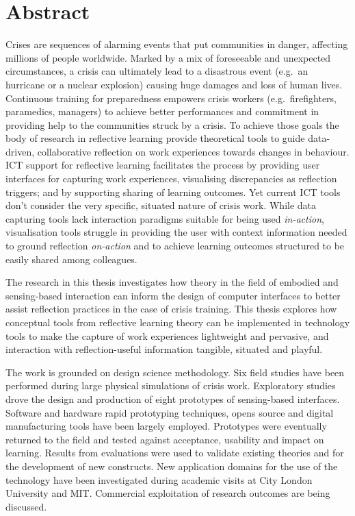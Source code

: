 \chapter*{Abstract}

Crises are sequences of alarming events that put communities in danger,
affecting millions of people worldwide. Marked by a mix of foreseeable
and unexpected circumstances, a crisis can ultimately lead to a
disastrous event (e.g.~an hurricane or a nuclear explosion) causing huge
damages and loss of human lives. Continuous training for preparedness
empowers crisis workers (e.g.~firefighters, paramedics, managers) to
achieve better performances and commitment in providing help to the
communities struck by a crisis. To achieve those goals the body of
research in reflective learning provide theoretical tools to guide
data-driven, collaborative reflection on work experiences towards
changes in behaviour. ICT support for reflective learning facilitates
the process by providing user interfaces for capturing work experiences,
visualising discrepancies as reflection triggers; and by supporting
sharing of learning outcomes. Yet current ICT tools don't consider the
very specific, situated nature of crisis work. While data capturing
tools lack interaction paradigms suitable for being used
\emph{in-action}, visualisation tools struggle in providing the user
with context information needed to ground reflection \emph{on-action}
and to achieve learning outcomes structured to be easily shared among
colleagues.

The research in this thesis investigates how theory in the field of
embodied and sensing-based interaction can inform the design of computer
interfaces to better assist reflection practices in the case of crisis
training. This thesis explores how conceptual tools from reflective
learning theory can be implemented in technology tools to make the
capture of work experiences lightweight and pervasive, and interaction
with reflection-useful information tangible, situated and playful.

The work is grounded on design science methodology. Six field studies
have been performed during large physical simulations of crisis work.
Exploratory studies drove the design and production of eight prototypes
of sensing-based interfaces. Software and hardware rapid prototyping
techniques, opens source and digital manufacturing tools have been
largely employed. Prototypes were eventually returned to the field and
tested against acceptance, usability and impact on learning. Results
from evaluations were used to validate existing theories and for the
development of new constructs. New application domains for the use of
the technology have been investigated during academic visits at City
London University and MIT. Commercial exploitation of research outcomes
are being discussed.

